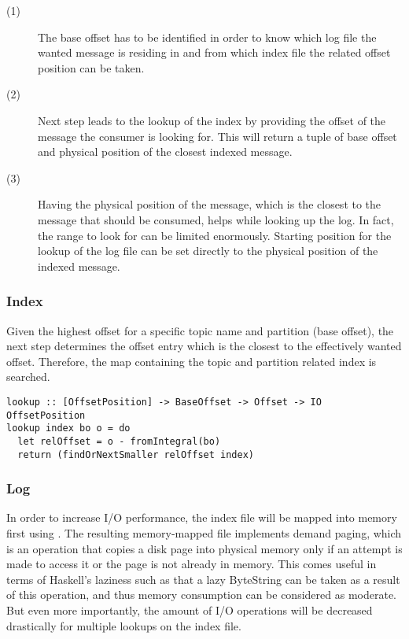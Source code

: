 \begin{description}
  \item[(1)]

    The base offset has to be identified in order to know which log file the
    wanted message is residing in and from which index file the related offset
    position can be taken.

  \item[(2)]

    Next step leads to the lookup of the index by providing the offset of the
    message the consumer is looking for. This will return a tuple of base offset
    and physical position of the closest indexed message.

  \item[(3)]

    Having the physical position of the message, which is the closest to the
    message that should be consumed, helps while looking up the log. In fact,
    the range to look for can be limited enormously. Starting position for the
    lookup of the log file can be set directly to the physical position of the
    indexed message.

\end{description}

\subsubsection{Index}

Given the highest offset for a specific topic name and partition (base offset),
the next step determines the offset entry which is the closest to the
effectively wanted offset. Therefore, the map containing the topic and partition
related index is searched.

\begin{lstlisting}
lookup :: [OffsetPosition] -> BaseOffset -> Offset -> IO OffsetPosition
lookup index bo o = do
  let relOffset = o - fromIntegral(bo)
  return (findOrNextSmaller relOffset index)
\end{lstlisting}


\subsubsection{Log}

In order to increase I/O performance, the index file will be mapped into memory
first using . The
resulting memory-mapped file implements demand paging, which is an operation
that copies a disk page into physical memory only if an attempt is made to
access it or the page is not already in memory. This comes useful in terms of
Haskell's laziness such as that a lazy ByteString can be taken as a result of
this operation, and thus memory consumption can be considered as moderate. But
even more importantly, the amount of I/O operations will be decreased
drastically for multiple lookups on the index file. 

